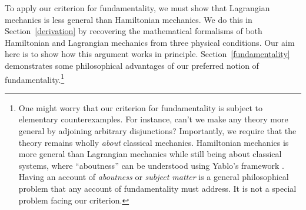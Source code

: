 \documentclass[12pt, english, twoside]{article} %
\begin{document}
To apply our criterion for fundamentality, we must show that Lagrangian mechanics is less general than Hamiltonian mechanics. We do this in Section~\ref{derivation} by recovering the mathematical formalisms of both Hamiltonian and Lagrangian mechanics from three physical conditions. Our aim here is to show how this argument works in principle. Section~\ref{fundamentality} demonstrates some philosophical advantages of our preferred notion of fundamentality.\footnote{One might worry that our criterion for fundamentality is subject to elementary counterexamples. For instance, can't we make any theory more general by adjoining arbitrary disjunctions? Importantly, we require that the theory remains wholly \textit{about} classical mechanics. Hamiltonian mechanics is more general than Lagrangian mechanics while still being about classical systems, where ``aboutness'' can be understood using Yablo's framework \parencites*[]{Yablo}. Having an account of \textit{aboutness} or \textit{subject matter} is a general philosophical problem that any account of fundamentality must address. It is not a special problem facing our criterion.} 


\end{document}
